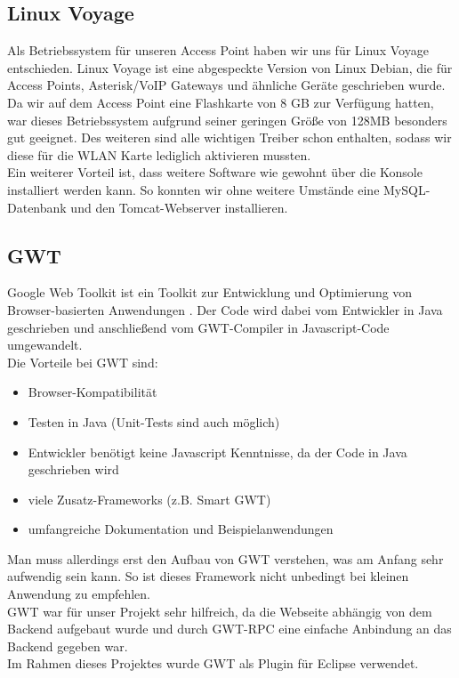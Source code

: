 \documentclass[12pt,a4paper,twoside]{article}
\begin{document}
\subsection{Linux Voyage \cite{voyage}} 
Als Betriebssystem für unseren Access Point haben wir uns für Linux Voyage entschieden. Linux Voyage ist eine abgespeckte Version von Linux Debian, die für Access Points, Asterisk/VoIP Gateways und ähnliche Geräte geschrieben wurde. Da wir auf dem Access Point eine Flashkarte von 8 GB zur Verfügung hatten, war dieses Betriebssystem aufgrund seiner geringen Größe von 128MB besonders gut geeignet. Des weiteren sind alle wichtigen Treiber schon enthalten, sodass wir diese für die WLAN Karte lediglich aktivieren mussten. \\
Ein weiterer Vorteil ist, dass weitere Software wie gewohnt über die Konsole installiert werden kann. So konnten wir ohne weitere Umstände eine MySQL-Datenbank und den Tomcat-Webserver installieren.

\subsection{GWT}
Google Web Toolkit ist ein Toolkit zur Entwicklung und Optimierung von Browser-basierten Anwendungen \cite{gwt}. Der Code wird dabei vom Entwickler in Java geschrieben und anschließend vom GWT-Compiler in Javascript-Code umgewandelt. \\
Die Vorteile bei GWT sind:
\begin{itemize}
 \item Browser-Kompatibilität
 \item Testen in Java (Unit-Tests sind auch möglich)
 \item Entwickler benötigt keine Javascript Kenntnisse, da der Code in Java geschrieben wird
 \item viele Zusatz-Frameworks (z.B. Smart GWT)
 \item umfangreiche Dokumentation und Beispielanwendungen
\end{itemize}

Man muss allerdings erst den Aufbau von GWT verstehen, was am Anfang sehr aufwendig sein kann. So ist dieses Framework nicht unbedingt bei kleinen Anwendung zu empfehlen. \\
GWT war für unser Projekt sehr hilfreich, da die Webseite abhängig von dem Backend aufgebaut wurde und durch GWT-RPC eine einfache Anbindung an das Backend gegeben war.\\
\newline
Im Rahmen dieses Projektes wurde GWT als Plugin für Eclipse \cite{gwtplugin} verwendet.
\end{document}
